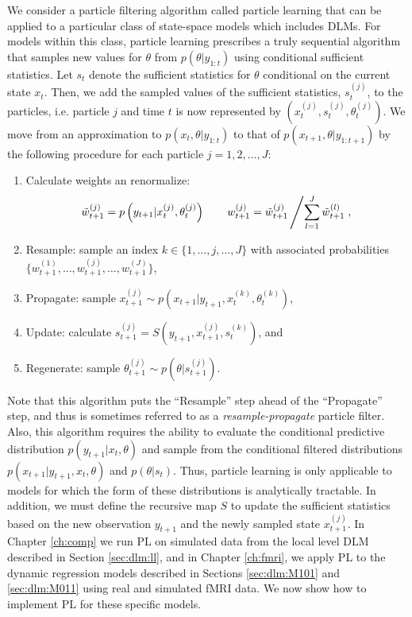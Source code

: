 We consider a particle filtering algorithm called particle learning \citep{Carv:Joha:Lope:Pols:part} that can be applied to a particular class of state-space models which includes DLMs. For models within this class, particle learning prescribes a truly sequential algorithm that samples new values for $\theta$ from $p(\theta|y_{1:t})$ using conditional sufficient statistics. Let $s_t$ denote the sufficient statistics for $\theta$ conditional on the current state $x_t$. Then, we add the sampled values of the sufficient statistics, $s_t^{(j)}$, to the particles, i.e. particle $j$ and time $t$ is now represented by $\left(x_t^{(j)},s_t^{(j)},\theta_t^{(j)}\right)$. We move from an approximation to $p(x_t,\theta|y_{1:t})$ to that of $p(x_{t+1},\theta|y_{1:t+1})$ by the following procedure for each particle $j = 1,2,\ldots,J$:
\begin{enumerate}
\item Calculate weights an renormalize:
    \[\tilde{w}_{t+1}^{(j)} = p\left(y_{t+1}|x_t^{(j)},\theta_t^{(j)}\right) \qquad w_{t+1}^{(j)} = \tilde{w}_{t+1}^{(j)} \left/ \sum_{l=1}^J \tilde{w}_{t+1}^{(l)}\right.,\]
\item Resample: sample an index $k \in \{1,\ldots,j,\ldots,J\}$ with associated probabilities $\{w_{t+1}^{(1)},\ldots,w_{t+1}^{(j)},\ldots,w_{t+1}^{(J)}\}$,
\item Propagate: sample $x_{t+1}^{(j)} \sim p\left(x_{t+1}|y_{t+1},x_t^{(k)},\theta_t^{(k)}\right)$,
\item Update: calculate $s_{t+1}^{(j)} = S\left(y_{t+1},x_{t+1}^{(j)},s_t^{(k)}\right)$, and
\item Regenerate: sample $\theta_{t+1}^{(j)} \sim p\left(\theta|s_{t+1}^{(j)}\right)$.
\end{enumerate}
Note that this algorithm puts the ``Resample'' step ahead of the ``Propagate'' step, and thus is sometimes referred to as a \emph{resample-propagate} particle filter. Also, this algorithm requires the ability to evaluate the conditional predictive distribution $p(y_{t+1}|x_t,\theta)$ and sample from the conditional filtered distributions $p(x_{t+1}|y_{t+1},x_t,\theta)$ and $p(\theta|s_t)$. Thus, particle learning is only applicable to models for which the form of these distributions is analytically tractable. In addition, we must define the recursive map $S$ to update the sufficient statistics based on the new observation $y_{t+1}$ and the newly sampled state $x_{t+1}^{(j)}$. In Chapter \ref{ch:comp} we run PL on simulated data from the local level DLM described in Section \ref{sec:dlm:ll}, and in Chapter \ref{ch:fmri}, we apply PL to the dynamic regression models described in Sections \ref{sec:dlm:M101} and \ref{sec:dlm:M011} using real and simulated fMRI data. We now show how to implement PL for these specific models.


